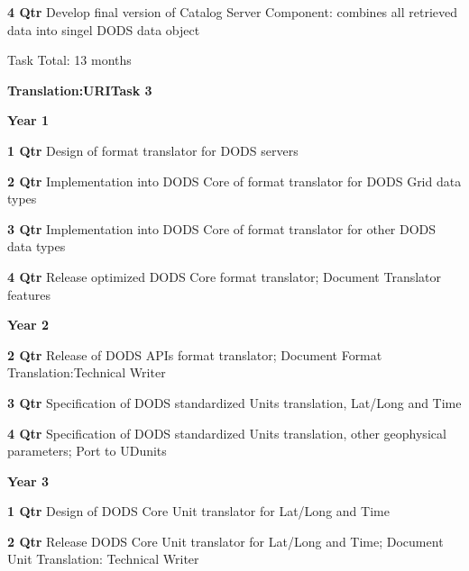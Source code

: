 \documentclass[12pt]{article}
\begin{document}
\begin{description}
\begin{description}
   \item{\bf 4 Qtr} Develop final version of Catalog Server Component:
     combines all retrieved data into singel DODS data object

 Task Total: 13 months

   \end{description}

\begin{center}
{\large \bf Translation:URITask 3}
\end{center}

 \item{\large \bf Year 1}
   \begin{description}
   \item{\bf 1 Qtr} Design of format translator for DODS servers

   \item{\bf 2 Qtr} Implementation into DODS Core of format translator for
     DODS Grid data types

   \item{\bf 3 Qtr} Implementation into DODS Core of format translator for
     other DODS data types

   \item{\bf 4 Qtr} Release optimized DODS Core format translator;
     Document Translator features

   \end{description}
 \item{\large \bf Year 2}
   \begin{description}

   \item{\bf 2 Qtr} Release of DODS APIs format translator; Document Format
     Translation:Technical Writer

   \item{\bf 3 Qtr} Specification of DODS standardized Units translation,
     Lat/Long and Time

   \item{\bf 4 Qtr} Specification of DODS standardized Units translation,
     other geophysical parameters; Port to UDunits

   \end{description}
 \item{\large \bf Year 3}
   \begin{description}

   \item{\bf 1 Qtr} Design of DODS Core Unit translator for Lat/Long and Time

   \item{\bf 2 Qtr} Release DODS Core Unit translator for Lat/Long and Time;
     Document Unit Translation: Technical Writer


\end{description}
\end{description}
\end{document}
